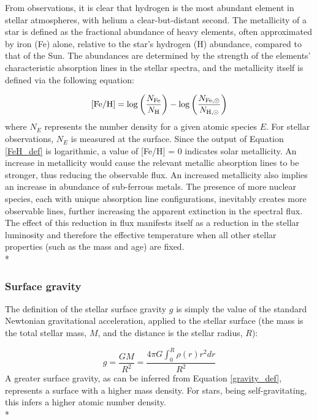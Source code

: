 \documentclass[12pt, a4paper]{report}
\begin{document}
From observations, it is clear that hydrogen is the most abundant element in stellar atmospheres, with helium a clear-but-distant second. The metallicity of a star is defined as the fractional abundance of heavy elements, often approximated by iron (Fe) alone, relative to the star's hydrogen (H) abundance, compared to that of the Sun. The abundances are determined by the strength of the elements' characteristic absorption lines in the stellar spectra, and the metallicity itself is defined via the following equation:

\begin{equation}
\textnormal{[Fe/H]} = \log\left(\frac{N_{\textnormal{Fe}}}{N_{\textnormal{H}}}\right) - \log\left(\frac{N_{\textnormal{Fe},\odot}}{N_{\textnormal{H},\odot}}\right)
\label{FeH_def}
\end{equation}
where $N_{E}$ represents the number density for a given atomic species $E$. For stellar observations, $N_{E}$ is measured at the surface. Since the output of Equation \ref{FeH_def} is logarithmic, a value of [Fe/H] = 0 indicates solar metallicity. An increase in metallicity would cause the relevant metallic absorption lines to be stronger, thus reducing the observable flux. An increased metallicity also implies an increase in abundance of sub-ferrous metals. The presence of more nuclear species, each with unique absorption line configurations, inevitably creates more observable lines, further increasing the apparent extinction in the spectral flux. The effect of this reduction in flux manifests itself as a reduction in the stellar luminosity and therefore the effective temperature when all other stellar properties (such as the mass and age) are fixed.\\*

\subsubsection{Surface gravity}

The definition of the stellar surface gravity $g$ is simply the value of the standard Newtonian gravitational acceleration, applied to the stellar surface (the mass is the total stellar mass, $M$, and the distance is the stellar radius, $R$):

\begin{equation}
g = \frac{GM}{R^{2}} = \frac{4\pi G\int_{0}^{R}\rho(r)r^{2}dr}{R^{2}}
\label{gravity_def}
\end{equation}
A greater surface gravity, as can be inferred from Equation \ref{gravity_def}, represents a surface with a higher mass density. For stars, being self-gravitating, this infers a higher atomic number density.  \\*
\end{document}
